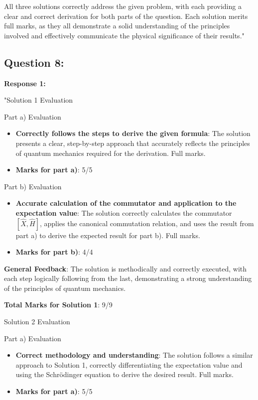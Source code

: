 \documentclass[a4paper,11pt]{article}
\begin{document}
All three solutions correctly address the given problem, with each providing a clear and correct derivation for both parts of the question. Each solution merits full marks, as they all demonstrate a solid understanding of the principles involved and effectively communicate the physical significance of their results."

\subsection*{Question 8:}

\textbf{Response 1:}

"Solution 1 Evaluation

Part a) Evaluation
\begin{itemize}
    \item \textbf{Correctly follows the steps to derive the given formula}: The solution presents a clear, step-by-step approach that accurately reflects the principles of quantum mechanics required for the derivation. Full marks.
    \item \textbf{Marks for part a)}: 5/5
\end{itemize}

Part b) Evaluation
\begin{itemize}
    \item \textbf{Accurate calculation of the commutator and application to the expectation value}: The solution correctly calculates the commutator \([ \hat{X}, \hat{H}]\), applies the canonical commutation relation, and uses the result from part a) to derive the expected result for part b). Full marks.
    \item \textbf{Marks for part b)}: 4/4
\end{itemize}

\textbf{General Feedback}: The solution is methodically and correctly executed, with each step logically following from the last, demonstrating a strong understanding of the principles of quantum mechanics.

\textbf{Total Marks for Solution 1}: 9/9

Solution 2 Evaluation

Part a) Evaluation

\begin{itemize}
    \item \textbf{Correct methodology and understanding}: The solution follows a similar approach to Solution 1, correctly differentiating the expectation value and using the Schrödinger equation to derive the desired result. Full marks.
    \item \textbf{Marks for part a)}: 5/5
\end{itemize}
\end{document}
